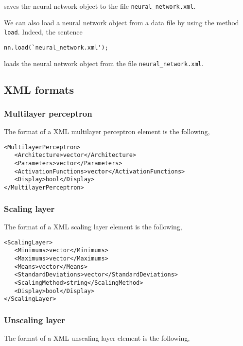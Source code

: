 \noindent saves the neural network object to the file \lstinline"neural_network.xml".

We can also load a neural network object from a data file by
using the method  \lstinline"load". Indeed, the sentence

\begin{lstlisting}
nn.load(`neural_network.xml');
\end{lstlisting}

\noindent loads the neural network object from the file \lstinline"neural_network.xml".

\subsection*{XML formats}

\subsubsection*{Multilayer perceptron}

The format of a XML multilayer perceptron element is the following,

\begin{lstlisting}
<MultilayerPerceptron>
   <Architecture>vector</Architecture>
   <Parameters>vector</Parameters>
   <ActivationFunctions>vector</ActivationFunctions>
   <Display>bool</Display>
</MultilayerPerceptron>
\end{lstlisting}

\subsubsection*{Scaling layer}

The format of a XML scaling layer element is the following,

\begin{lstlisting}
<ScalingLayer>
   <Minimums>vector</Minimums>
   <Maximums>vector</Maximums>
   <Means>vector</Means>
   <StandardDeviations>vector</StandardDeviations>
   <ScalingMethod>string</ScalingMethod>
   <Display>bool</Display>
</ScalingLayer>
\end{lstlisting}

\subsubsection*{Unscaling layer}

The format of a XML unscaling layer element is the following,

